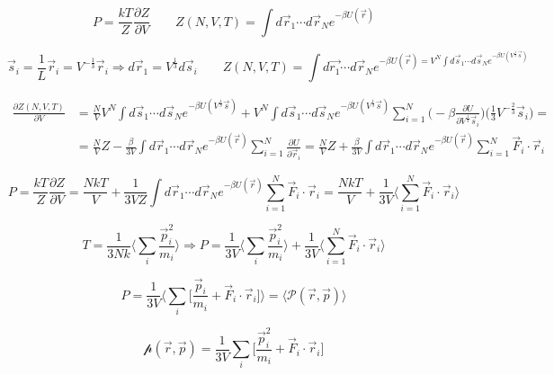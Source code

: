 	$$P = \frac{kT}{Z}\frac{\partial Z}{\partial V}\qquad Z(N, V, T) = \int d\vec{r}_1\cdots d\vec{r}_Ne^{-\beta U(\vec{r})}$$

	$$\vec{s}_i = \frac{1}{L}\vec{r}_i = V^{-\frac{1}{3}}\vec{r}_i \Rightarrow d\vec{r}_1 = V^{\frac{1}{3}}d\vec{s}_i\qquad Z(N, V, T) = \int d\vec{r_1}\cdots d\vec{r}_Ne^{-\beta U(\vec{r}) = V^N\int d\vec{s}_1\cdots d\vec{s}_Ne^{-\beta U(V^{\frac{1}{3}}\vec{s})}}$$

	\begin{align*}
		\frac{\partial Z(N, V, T)}{\partial V} &= \frac{N}{V}V^N\int d\vec{s}_1\cdots d\vec{s}_Ne^{-\beta U(V^{\frac{1}{3}}\vec{s})} + V^N\int d\vec{s}_1\cdots d\vec{s}_Ne^{-\beta U(V^{\frac{1}{3}}\vec{s})}\sum\limits_{i=1}^N\biggl(-\beta\frac{\partial U}{\partial V^{\frac{1}{3}}\vec{s}_i}\biggr)\biggl(\frac{1}{3}V^{-\frac{2}{3}}\vec{s}_i\biggr) = \\
																					 &=\frac{N}{V}Z - \frac{\beta}{3V}\int d\vec{r}_1\cdots d\vec{r}_Ne^{-\beta U(\vec{r})}\sum\limits_{i=1}^N\frac{\partial U}{\partial\vec{r}_i} = \frac{N}{V}Z + \frac{\beta}{3V}\int d\vec{r}_1\cdots d\vec{r}_Ne^{-\beta U(\vec{r})}\sum\limits_{i=1}^N\vec{F}_i\cdot\vec{r}_i
	\end{align*}

	$$P = \frac{kT}{Z}\frac{\partial Z}{\partial V} = \frac{NkT}{V} + \frac{1}{3VZ}\int d\vec{r}_1\cdots d\vec{r}_N e^{-\beta U(\vec{r})}\sum\limits_{i=1}^N\vec{F}_i\cdot\vec{r}_i = \frac{NkT}{V} + \frac{1}{3V}\biggl\langle\sum\limits_{i=1}^N\vec{F}_i\cdot\vec{r}_i\biggr\rangle$$

	$$T = \frac{1}{3Nk}\biggl\langle\sum\limits_i\frac{\vec{p}_i^2}{m_i}\biggr\rangle\Rightarrow P = \frac{1}{3V}\biggl\langle\sum\limits_i\frac{\vec{p}^2_i}{m_i}\biggr\rangle + \frac{1}{3V}\biggl\langle\sum\limits_{i=1}^N\vec{F}_i\cdot\vec{r}_i\biggr\rangle$$

	$$P = \frac{1}{3V}\biggl\langle\sum\limits_i\biggl[\frac{\vec{p}_i}{m_i}+ \vec{F}_i\cdot\vec{r}_i\biggr]\biggr\rangle = \langle\mathcal{P}(\vec{r}, \vec{p})\rangle$$

	$$\mathcal{p}(\vec{r}, \vec{p}) = \frac{1}{3V}\sum\limits_i\biggl[\frac{\vec{p}_i^2}{m_i}+ \vec{F}_i\cdot\vec{r}_i\biggr]$$
